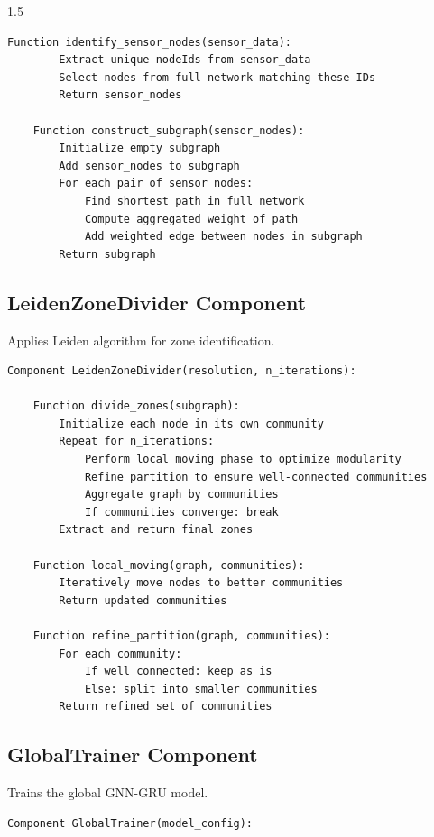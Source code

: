 \begin{spacing}{1.5}
\begin{lstlisting}[basicstyle=\ttfamily\small, breaklines=true, frame=single]
    Function identify_sensor_nodes(sensor_data):
        Extract unique nodeIds from sensor_data
        Select nodes from full network matching these IDs
        Return sensor_nodes

    Function construct_subgraph(sensor_nodes):
        Initialize empty subgraph
        Add sensor_nodes to subgraph
        For each pair of sensor nodes:
            Find shortest path in full network
            Compute aggregated weight of path
            Add weighted edge between nodes in subgraph
        Return subgraph
\end{lstlisting}


\subsection{LeidenZoneDivider Component}

Applies Leiden algorithm for zone identification.

\begin{lstlisting}[basicstyle=\ttfamily\small, breaklines=true, frame=single]
Component LeidenZoneDivider(resolution, n_iterations):

    Function divide_zones(subgraph):
        Initialize each node in its own community
        Repeat for n_iterations:
            Perform local moving phase to optimize modularity
            Refine partition to ensure well-connected communities
            Aggregate graph by communities
            If communities converge: break
        Extract and return final zones

    Function local_moving(graph, communities):
        Iteratively move nodes to better communities
        Return updated communities

    Function refine_partition(graph, communities):
        For each community:
            If well connected: keep as is
            Else: split into smaller communities
        Return refined set of communities
\end{lstlisting}


\subsection{GlobalTrainer Component}

Trains the global GNN-GRU model.

\begin{lstlisting}[basicstyle=\ttfamily\small, breaklines=true, frame=single]
Component GlobalTrainer(model_config):


\end{lstlisting}
\end{spacing}
